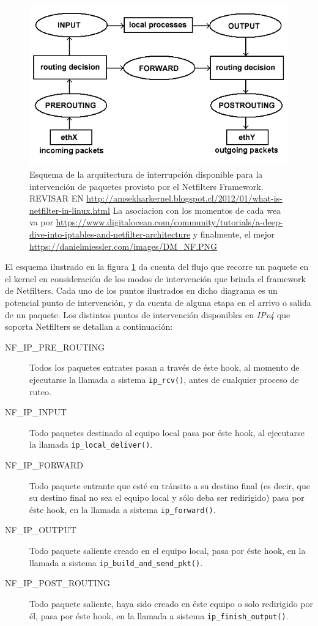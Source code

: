 \begin{figure}[!h]
	\centering
	\includegraphics[scale=.5]{imagenes/netfilterArchitecture}
	\caption{Esquema de la arquitectura de interrupción disponible para la intervención de paquetes provisto por el Netfilters Framework. REVISAR EN \url{http://amsekharkernel.blogspot.cl/2012/01/what-is-netfilter-in-linux.html} La asociacion con los momentos de cada wea va por \url{https://www.digitalocean.com/community/tutorials/a-deep-dive-into-iptables-and-netfilter-architecture} y finalmente, el mejor \url{https://danielmiessler.com/images/DM_NF.PNG}}
	\label{fig:netfilterArchitecture}
\end{figure}

El esquema ilustrado en la figura \ref{fig:netfilterArchitecture} da cuenta del flujo que recorre un paquete en el kernel en consideración de los modos de intervención que brinda el framework de Netfilters. Cada uno de los puntos ilustrados en dicho diagrama es un potencial punto de intervención, y da cuenta de alguna etapa en el arrivo o salida de un paquete. Los distintos puntos de intervención disponibles en \emph{IPv4} que soporta Netfilters se detallan a continuación:

\begin{description}
\item[NF\_IP\_PRE\_ROUTING] Todos los paquetes entrates pasan a través de éste hook, al momento de ejecutarse la llamada a sistema \verb=ip_rcv()=, antes de cualquier proceso de ruteo.
\item[NF\_IP\_INPUT] Todo paquetes destinado al equipo local pasa por éste hook, al ejecutarse la llamada \verb=ip_local_deliver()=.
\item[NF\_IP\_FORWARD] Todo paquete entrante que esté en tránsito a su destino final (es decir, que su destino final no sea el equipo local y sólo deba ser redirigido) pasa por éste hook, en la llamada a sistema \verb=ip_forward()=.
\item[NF\_IP\_OUTPUT] Todo paquete saliente creado en el equipo local, pasa por éste hook, en la llamada a sistema \verb=ip_build_and_send_pkt()=.
\item[NF\_IP\_POST\_ROUTING] Todo paquete saliente, haya sido creado en éste equipo o solo redirigido por él, pasa por éste hook, en la llamada a sistema \verb=ip_finish_output()=.
\end{description}

